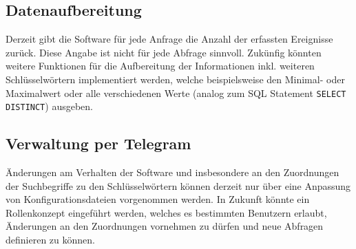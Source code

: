 \subsection{Datenaufbereitung}

Derzeit gibt die Software für jede Anfrage die Anzahl der erfassten Ereignisse zurück. Diese Angabe ist nicht für jede Abfrage sinnvoll. Zukünfig könnten weitere Funktionen für die Aufbereitung der Informationen inkl. weiteren Schlüsselwörtern implementiert werden, welche beispielsweise den Minimal- oder Maximalwert oder alle verschiedenen Werte (analog zum SQL Statement \lstinline{SELECT DISTINCT}) ausgeben.

\subsection{Verwaltung per Telegram}

Änderungen am Verhalten der Software und insbesondere an den Zuordnungen der Suchbegriffe zu den Schlüsselwörtern können derzeit nur über eine Anpassung von Konfigurationsdateien vorgenommen werden. In Zukunft könnte ein Rollenkonzept eingeführt werden, welches es bestimmten Benutzern erlaubt, Änderungen an den Zuordnungen vornehmen zu dürfen und neue Abfragen definieren zu können.
